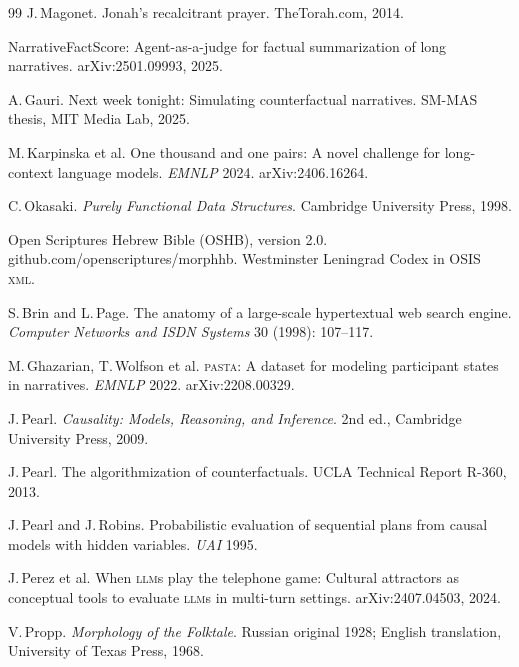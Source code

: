 \documentclass[11pt]{article}
\theoremstyle{rukha}
\begin{document}
\begin{small}
\begin{thebibliography}{99}
J.\,Magonet.
\newblock Jonah's recalcitrant prayer.
\newblock TheTorah.com, 2014.

NarrativeFactScore: Agent-as-a-judge for factual summarization of long narratives.
\newblock arXiv:2501.09993, 2025.

A.\,Gauri.
\newblock Next week tonight: Simulating counterfactual narratives.
\newblock SM-MAS thesis, MIT Media Lab, 2025.

M.\,Karpinska et al.
\newblock One thousand and one pairs: A novel challenge for long-context language models.
\newblock \emph{EMNLP} 2024.
\newblock arXiv:2406.16264.

C.\,Okasaki.
\newblock \emph{Purely Functional Data Structures}.
\newblock Cambridge University Press, 1998.

Open Scriptures Hebrew Bible (OSHB), version 2.0.
\newblock github.com/openscriptures/morphhb. Westminster Leningrad Codex in OSIS \textsc{xml}.

S.\,Brin and L.\,Page.
\newblock The anatomy of a large-scale hypertextual web search engine.
\newblock \emph{Computer Networks and ISDN Systems} 30 (1998): 107–117.

M.\,Ghazarian, T.\,Wolfson et al.
\newblock \textsc{pasta}: A dataset for modeling participant states in narratives.
\newblock \emph{EMNLP} 2022.
\newblock arXiv:2208.00329.

J.\,Pearl.
\newblock \emph{Causality: Models, Reasoning, and Inference}.
\newblock 2nd ed., Cambridge University Press, 2009.

J.\,Pearl.
\newblock The algorithmization of counterfactuals.
\newblock UCLA Technical Report R-360, 2013.

J.\,Pearl and J.\,Robins.
\newblock Probabilistic evaluation of sequential plans from causal models with hidden variables.
\newblock \emph{UAI} 1995.

J.\,Perez et al.
\newblock When \textsc{llm}s play the telephone game: Cultural attractors as conceptual tools to evaluate \textsc{llm}s in multi-turn settings.
\newblock arXiv:2407.04503, 2024.

V.\,Propp.
\newblock \emph{Morphology of the Folktale}.
\newblock Russian original 1928; English translation, University of Texas Press, 1968.


\end{thebibliography}
\end{small}
\end{document}
